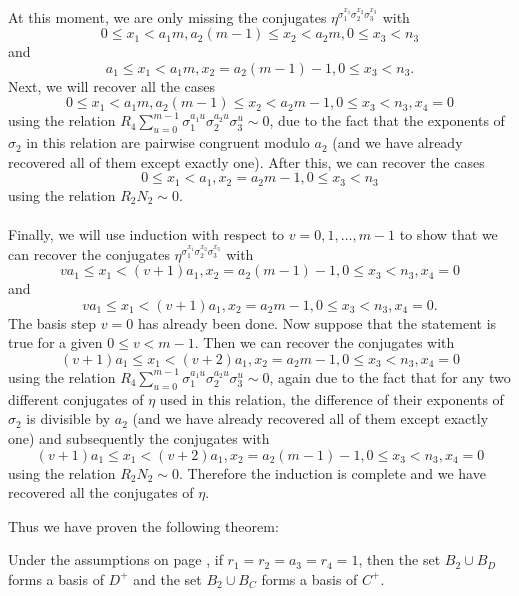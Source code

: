 \paragraph*{}
At this moment, we are only missing the conjugates $\eta^{\sigma_1^{x_1}\sigma_2^{x_2}\sigma_3^{x_3}}$ with $$0\le x_1< a_1m, a_2(m-1)\le x_2 <a_2m, 0\le x_3<n_3$$ and $$a_1\le x_1< a_1m, x_2=a_2(m-1)-1, 0\le x_3<n_3.$$
Next, we will recover all the cases $$0\leq x_1 < a_1m, a_2(m-1)\leq x_2 < a_2m-1, 0\leq x_3 <n_3,x_4=0$$ %
using the relation $R_4\sum_{u=0}^{m-1}\sigma_1^{a_1u}\sigma_2^{a_2u}\sigma_3^u\sim 0$, due to the fact that %
the exponents of $\sigma_2$ in this relation are pairwise congruent modulo $a_2$ (and we have already recovered all of them except exactly one). %
 After this, we can recover the cases $$0\leq x_1 < a_1, x_2 = a_2m-1, 0\leq x_3 <n_3$$ using the relation $R_2N_2\sim 0$.
\paragraph*{}
Finally, we will use induction with respect to $v=0,1,\dots, m-1$ to show that we can recover the conjugates $\eta^{\sigma_1^{x_1}\sigma_2^{x_2}\sigma_3^{x_3}}$ with $$va_1\leq x_1 < (v+1)a_1,x_2=a_2(m-1)-1,0\le x_3<n_3,x_4=0$$ and $$va_1\leq x_1 < (v+1)a_1,x_2=a_2m-1,0\le x_3<n_3,x_4=0.$$
The basis step $v=0$ has already been done. Now suppose that the statement is true for a given $0\leq v<m-1$. Then we can recover the conjugates with $$(v+1)a_1\leq x_1 < (v+2)a_1,x_2=a_2m-1,0\le x_3<n_3,x_4=0$$
using the relation $R_4\sum_{u=0}^{m-1}\sigma_1^{a_1u}\sigma_2^{a_2u}\sigma_3^u\sim 0$, again due to the fact that for any two different conjugates of $\eta$ used in this relation, the difference of their exponents of $\sigma_2$ is divisible by $a_2$ (and we have already recovered all of them except exactly one) and subsequently the conjugates with $$(v+1)a_1\leq x_1 < (v+2)a_1,x_2=a_2(m-1)-1,0\le x_3<n_3,x_4=0$$ using the relation $R_2N_2\sim 0$.
Therefore the induction is complete and we have recovered all the conjugates of $\eta$. 

Thus we have proven the following theorem:
\begin{theorem}\label{th2}
Under the assumptions on page \pageref{assum}, if $r_1=r_2=a_3=r_4=1$, then the set $B_{2}\cup B_D$ forms a basis of $D^+$ and the set $B_{2}\cup B_C$ forms a basis of $C^+$.
\end{theorem}
